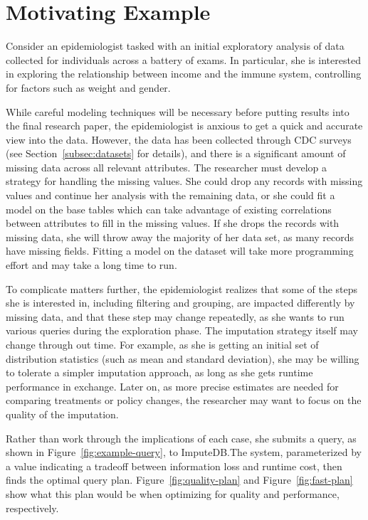 \section{Motivating Example}
Consider an epidemiologist tasked with an initial
exploratory analysis of data collected for individuals across
a battery of exams. In particular, she is interested in exploring
the relationship between income and the immune system,
controlling for factors such as weight and gender.

While careful modeling techniques will be necessary before putting
results into the final research paper, the epidemiologist is anxious
to get a quick and accurate view into the data. However,
the data has been collected through CDC surveys (see Section~\ref{subsec:datasets} for details),
and there is a significant amount of missing data across all
relevant attributes. The researcher must develop a strategy
for handling the missing values. She could drop any records with
missing values and continue her analysis with the remaining data,
or she could fit a model on the base tables which can take advantage of existing correlations between attributes to fill in the missing values.
If she drops the records with missing data, she will throw away the majority of her data set, as many records have missing fields.
Fitting a model on the dataset will take more programming effort and may take a long time to run.

To complicate matters further, the epidemiologist realizes that
some of the steps she is interested in, including filtering and grouping,
are impacted differently by missing data, and that these step may change
repeatedly, as she wants to run various queries during the exploration phase.
The imputation strategy itself may change through out time. For example, as she is getting an initial
set of distribution statistics (such as mean and standard deviation), she may be willing to tolerate
a simpler imputation approach, as long as she gets runtime performance in exchange. Later on,
as more precise estimates are needed for comparing treatments or policy changes, the researcher
may want to focus on the quality of the imputation.

Rather than work through
the implications of each case, she submits a query, as shown in Figure~\ref{fig:example-query}, to ImputeDB.\@ The system, parameterized by a value indicating
a tradeoff between information loss and runtime cost, then finds
the optimal query plan. Figure~\ref{fig:quality-plan} and Figure~\ref{fig:fast-plan} show what this plan would be
when optimizing for quality and performance, respectively.

